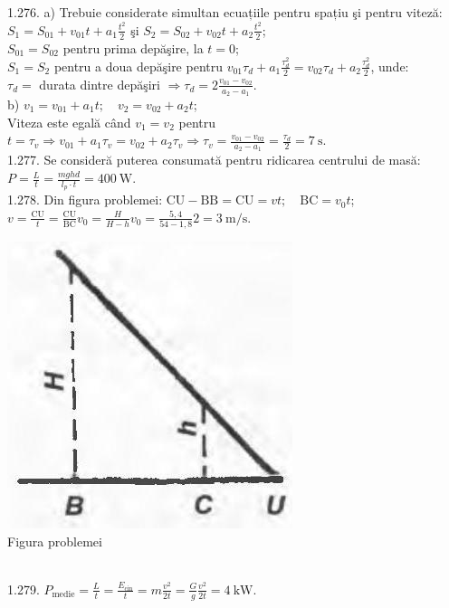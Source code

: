 1.276. a) Trebuie considerate simultan ecuațiile pentru spațiu şi pentru viteză:\\ $S_{1}=S_{01}+v_{01} t+a_{1} \frac{t^{2}}{2}$ şi $S_{2}=S_{02}+v_{02} t+a_{2} \frac{t^{2}}{2}$;\\ $S_{01}=S_{02}$ pentru prima depăşire, la $t=0$;\\ $S_{1}=S_{2}$ pentru a doua depăşire pentru $v_{01} \tau_{d}+a_{1} \frac{\tau_{d}^{2}}{2}=v_{02} \tau_{d}+a_{2} \frac{\tau_{d}^{2}}{2}$, unde:\\ $\tau_{d}=$ durata dintre depăşiri $\Rightarrow \tau_{d}=2 \frac{v_{01}-v_{02}}{a_{2}-a_{1}}$.\\ b) $v_{1}=v_{01}+a_{1} t; \quad v_{2}=v_{02}+a_{2} t$;\\ Viteza este egală când $v_{1}=v_{2}$ pentru $t=\tau_{v} \Rightarrow v_{01}+a_{1} \tau_{v}=v_{02}+a_{2} \tau_{v} \Rightarrow \tau_{v}=\frac{v_{01}-v_{02}}{a_{2}-a_{1}}=\frac{\tau_{d}}{2}=7 \mathrm{~s}$.\\

1.277. Se consideră puterea consumată pentru ridicarea centrului de masă:\\ $P=\frac{L}{t}=\frac{m g h d}{l_{p} \cdot t}=400 \mathrm{~W}$.\\

1.278. Din figura problemei: $\mathrm{CU}-\mathrm{BB}=\mathrm{CU}=v t; \quad \mathrm{BC}=v_{0} t$;\\ $v=\frac{\mathrm{CU}}{t}=\frac{\mathrm{CU}}{\mathrm{BC}} v_{0}=\frac{H}{H-h} v_{0}=\frac{5,4}{54-1,8} 2=3 \mathrm{~m} / \mathrm{s}$.\\ \begin{center} \includegraphics[width=0.4\linewidth]{images/2025_07_01_5b3ff9fa0d508c8e9f17g-259}\\ Figura problemei \end{center}\\

1.279. $P_{\text {medie}}=\frac{L}{t}=\frac{E_{\text {cin}}}{t}=m \frac{v^{2}}{2 t}=\frac{G}{g} \frac{v^{2}}{2 t}=4 \mathrm{~kW}$.\\


